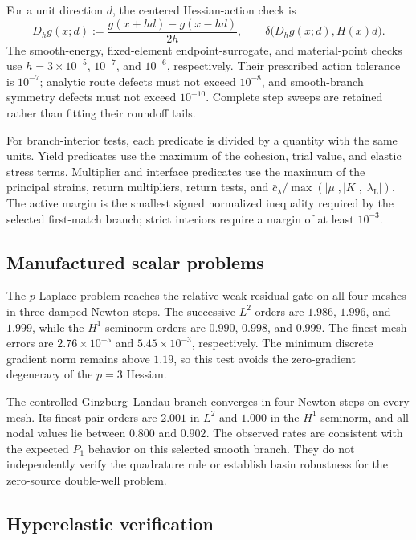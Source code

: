For a unit direction $d$, the centered Hessian-action check is
\begin{equation}
  D_hg(x;d):=\frac{g(x+hd)-g(x-hd)}{2h},
  \qquad \delta\bigl(D_hg(x;d),H(x)d\bigr).
  \label{eq:centered-action-check}
\end{equation}
The smooth-energy, fixed-element endpoint-surrogate, and material-point checks use
$h=3\times10^{-5}$, $10^{-7}$, and $10^{-6}$, respectively. Their prescribed
action tolerance is $10^{-7}$; analytic route defects must not exceed
$10^{-8}$, and smooth-branch symmetry defects must not exceed $10^{-10}$.
Complete step sweeps are retained rather than fitting their roundoff tails.

For branch-interior tests, each predicate is divided by a quantity with the
same units. Yield predicates use the maximum of the cohesion, trial value, and
elastic stress terms. Multiplier and interface predicates use the maximum of
the principal strains, return multipliers, return tests, and
$\bar c_\lambda/\max(|\mu|,|K|,|\lambda_{\mathrm L}|)$. The active margin is
the smallest signed normalized inequality required by the selected first-match
branch; strict interiors require a margin of at least $10^{-3}$.

\subsection{Manufactured scalar problems}
\label{subsec:manufactured-verification}

The $p$-Laplace problem reaches the relative weak-residual gate on all four
meshes in three damped Newton steps. The successive $L^2$ orders are $1.986$,
$1.996$, and $1.999$, while the $H^1$-seminorm orders are $0.990$, $0.998$,
and $0.999$. The finest-mesh errors are $2.76\times10^{-5}$ and
$5.45\times10^{-3}$, respectively. The minimum discrete gradient norm remains
above $1.19$, so this test avoids the zero-gradient degeneracy of the $p=3$
Hessian.

The controlled Ginzburg--Landau branch converges in four Newton steps on every
mesh. Its finest-pair orders are $2.001$ in $L^2$ and $1.000$ in the $H^1$
seminorm, and all nodal values lie between $0.800$ and $0.902$. The observed
rates are consistent with the expected $P_1$ behavior on this selected smooth
branch. They do not independently verify the quadrature rule or establish basin
robustness for the zero-source double-well problem.

\subsection{Hyperelastic verification}
\label{sec:val-hyperelasticity}

